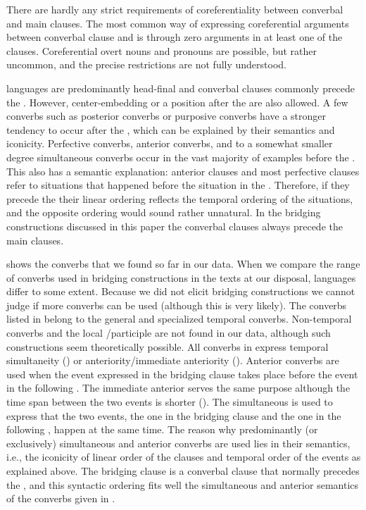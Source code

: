 \documentclass[output=paper]{LSP/langsci}
\begin{document}
There are hardly any strict requirements of coreferentiality between converbal and main clauses. The most common way of expressing coreferential arguments between converbal clause and  is through zero arguments in at least one of the clauses. Coreferential overt nouns and pronouns are possible, but rather uncommon, and the precise restrictions are not fully understood.

 languages are predominantly head-final and converbal clauses commonly precede the . However, center-embedding or a position after the  are also allowed. A few converbs such as posterior converbs or purposive converbs have a stronger tendency to occur after the , which can be explained by their semantics and iconicity. Perfective converbs, anterior converbs, and to a somewhat smaller degree simultaneous converbs occur in the vast majority of examples before the . This also has a semantic explanation: anterior  clauses and most perfective  clauses refer to situations that happened before the situation in the . Therefore, if they precede the  their linear ordering reflects the temporal ordering of the situations, and the opposite ordering would sound rather unnatural. In the bridging constructions discussed in this paper the converbal clauses always precede the main clauses.

 shows the converbs that we found so far in our data. When we compare the range of converbs used in bridging constructions in the texts at our disposal,  languages differ to some extent. Because we did not elicit bridging constructions we cannot judge if more converbs can be used (although this is very likely). The converbs listed in  belong to the general and specialized temporal converbs. Non-temporal converbs and the local /participle are not found in our data, although such constructions seem theoretically possible. All converbs in  express temporal simultaneity () or anteriority/immediate anteriority (). Anterior converbs are used when the event expressed in the bridging clause takes place before the event in the following . The immediate anterior  serves the same purpose although the time span between the two events is shorter (). The simultaneous  is used to express that the two events, the one in the bridging clause and the one in the following , happen at the same time. The reason why predominantly (or exclusively) simultaneous and anterior converbs are used lies in their semantics, i.e., the iconicity of linear order of the clauses and temporal order of the events as explained above. The bridging clause is a converbal clause that normally precedes the , and this syntactic ordering fits well the simultaneous and anterior semantics of the converbs given in .    
\end{document}
